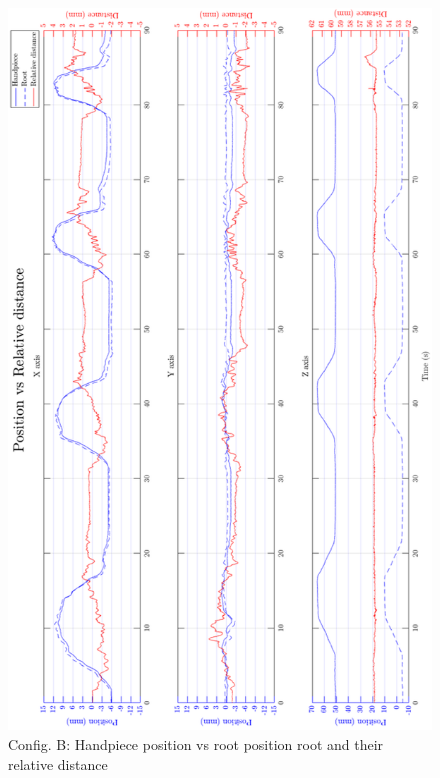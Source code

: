 \begin{figure}[htbp]
\begin{center}
\includegraphics[width=0.9\linewidth]{Images/exp/exp1_2_1.png}
\caption{Config. B: Handpiece position vs root position root and their relative distance}
\label{fig: exp1_2_1}
\end{center}
\end{figure}	
			
